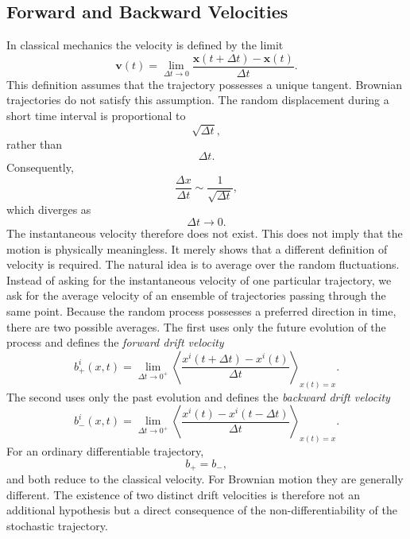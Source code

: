 \subsection{Forward and Backward Velocities}
In classical mechanics the velocity is defined by the limit
\begin{equation}
\mathbf{v}(t)=\lim_{\Delta t\rightarrow0}\frac{\mathbf{x}(t+\Delta t)
    -\mathbf{x}(t)}{\Delta t}.
\label{eq:classicalvelocity}
\end{equation}
This definition assumes that the trajectory possesses a unique tangent.
Brownian trajectories do not satisfy this assumption.
The random displacement during a short time interval is proportional to
\[\sqrt{\Delta t},\]
rather than
\[\Delta t.\]
Consequently,
\[\frac{\Delta x}{\Delta t}\sim\frac{1}{\sqrt{\Delta t}},\]
which diverges as
\[\Delta t\rightarrow0.\]
The instantaneous velocity therefore does not exist.
This does not imply that the motion is physically meaningless.
It merely shows that a different definition of velocity is required.
The natural idea is to average over the random fluctuations.
Instead of asking for the instantaneous velocity of one particular
trajectory, we ask for the average velocity of an ensemble of
trajectories passing through the same point.
Because the random process possesses a preferred direction in time,
there are two possible averages.
The first uses only the future evolution of the process and defines the
\emph{forward drift velocity}
\begin{equation}
b^{i}_{+}(x,t)=\lim_{\Delta t\rightarrow0^{+}}
\left<\frac{x^{i}(t+\Delta t)-x^{i}(t)}{\Delta t}\right>_{x(t)=x}.
\label{eq:forwarddrift}
\end{equation}
The second uses only the past evolution and defines the
\emph{backward drift velocity}
\begin{equation}
b^{i}_{-}(x,t)=\lim_{\Delta t\rightarrow0^{+}}
\left<\frac{x^{i}(t)-x^{i}(t-\Delta t)}{\Delta t}\right>_{x(t)=x}.
\label{eq:backwarddrift}
\end{equation}
For an ordinary differentiable trajectory,
\[b_{+}=b_{-},\]
and both reduce to the classical velocity.
For Brownian motion they are generally different.
The existence of two distinct drift velocities is therefore not an
additional hypothesis but a direct consequence of the
non-differentiability of the stochastic trajectory.
